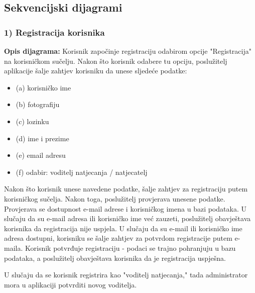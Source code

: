 				\eject		
				
			\subsection{Sekvencijski dijagrami}
										
														
				\subsubsection{1) Registracija korisnika}
				
				\textbf{Opis dijagrama:}
				Korisnik započinje registraciju odabirom opcije "Registracija" na korisničkom sučelju. Nakon što korisnik odabere tu opciju, poslužitelj aplikacije šalje zahtjev korisniku da unese sljedeće podatke:
				
				\begin{itemize}
					\item (a) korisničko ime
					\item (b) fotografiju
					\item (c) lozinku
					\item (d) ime i prezime
					\item (e) email adresu
					\item (f) odabir: voditelj natjecanja / natjecatelj
				\end{itemize}
				
				Nakon što korisnik unese navedene podatke, šalje zahtjev za registraciju putem korisničkog sučelja. Nakon toga, poslužitelj provjerava unesene podatke. Provjerava  se dostupnost e-mail adrese i korisničkog imena u bazi podataka. U slučaju da su e-mail adresa ili korisničko ime već zauzeti, poslužitelj obavještava korisnika da registracija nije uspjela.
				U slučaju da su e-mail ili korisničko ime adresa dostupni, korisniku se šalje zahtjev za potvrdom registracije putem e-maila. Korisnik potvrđuje registraciju - podaci se trajno pohranjuju u bazu podataka, a poslužitelj obavještava korisnika da je registracija uspješna.
				
				U slučaju da se korisnik registrira kao "voditelj natjecanja," tada administrator mora u aplikaciji potvrditi novog voditelja. 
				
